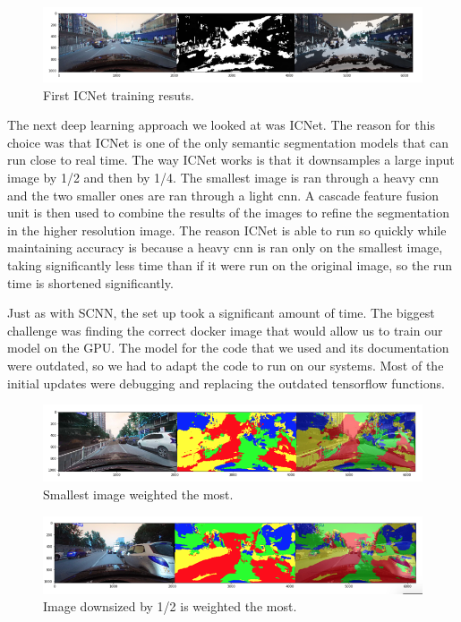 \documentclass[twoside,twocolumn]{article}
\begin{document}
\begin{figure}
  \includegraphics[width=\linewidth]{1.png}
  \caption{First ICNet training resuts.}
  \label{fig:first}
\end{figure}

\par The next deep learning approach we looked at was ICNet. The reason for this choice was that ICNet is one of the only semantic segmentation models that can run close to real time. The way ICNet works is that it downsamples a large input image by 1/2 and then by 1/4. The smallest image is ran through a heavy cnn and the two smaller ones are ran through a light cnn. A cascade feature fusion unit is then used to combine the results of the images to refine the segmentation in the higher resolution image. The reason ICNet is able to run so quickly while maintaining accuracy is because a heavy cnn is ran only on the smallest image, taking significantly less time than if it were run on the original image, so the run time is shortened significantly.
\par Just as with SCNN, the set up took a significant amount of time. The biggest challenge was finding the correct docker image that would allow us to train our model on the GPU. The model for the code that we used and its documentation were outdated, so we had to adapt the code to run on our systems. Most of the initial updates were debugging and replacing the outdated tensorflow functions.

\begin{figure}
  \includegraphics[width=\linewidth]{2.png}
  \caption{Smallest image weighted the most.}
  \label{fig:weights1}
\end{figure}

\begin{figure}
  \includegraphics[width=\linewidth]{3.png}
  \caption{Image downsized by 1/2 is weighted the most.}
  \label{fig:weights2}
\end{figure}
\end{document}

